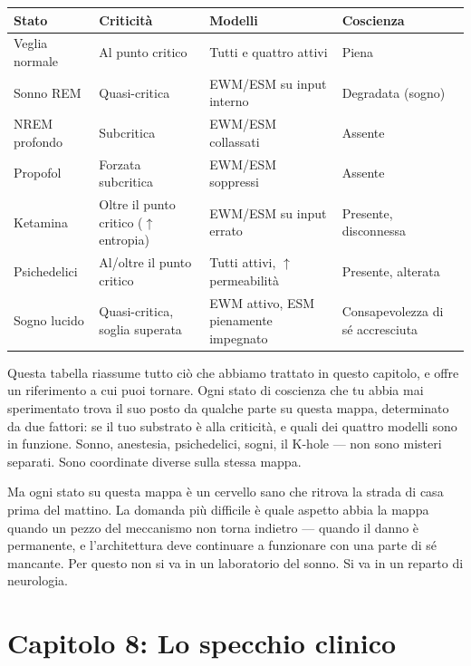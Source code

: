 \documentclass[11pt, twoside, openright]{book}
\begin{document}
\small
\begin{xltabular}{\linewidth}{X X X X}
\toprule
\textbf{Stato} & \textbf{Criticità} & \textbf{Modelli} & \textbf{Coscienza} \\
\midrule\endhead
Veglia normale & Al punto critico & Tutti e quattro attivi & Piena \\[4pt]
Sonno REM & Quasi-critica & EWM/\allowbreak{}ESM su input interno & Degradata (sogno) \\[4pt]
NREM profondo & Subcritica & EWM/\allowbreak{}ESM collassati & Assente \\[4pt]
Propofol & Forzata subcritica & EWM/\allowbreak{}ESM soppressi & Assente \\[4pt]
Ketamina & Oltre il punto critico ($\uparrow$ entropia) & EWM/\allowbreak{}ESM su input errato & Presente, disconnessa \\[4pt]
Psichedelici & Al/\allowbreak{}oltre il punto critico & Tutti attivi, $\uparrow$ permeabilità & Presente, alterata \\[4pt]
Sogno lucido & Quasi-critica, soglia superata & EWM attivo, ESM pienamente impegnato & Consapevolezza di sé accresciuta \\[4pt]
\bottomrule
\end{xltabular}
\normalsize


Questa tabella riassume tutto ciò che abbiamo trattato in questo capitolo, e offre un riferimento a cui puoi tornare. Ogni stato di coscienza che tu abbia mai sperimentato trova il suo posto da qualche parte su questa mappa, determinato da due fattori: se il tuo substrato è alla criticità, e quali dei quattro modelli sono in funzione. Sonno, anestesia, psichedelici, sogni, il K-hole --- non sono misteri separati. Sono coordinate diverse sulla stessa mappa.

Ma ogni stato su questa mappa è un cervello sano che ritrova la strada di casa prima del mattino. La domanda più difficile è quale aspetto abbia la mappa quando un pezzo del meccanismo non torna indietro --- quando il danno è permanente, e l'architettura deve continuare a funzionare con una parte di sé mancante. Per questo non si va in un laboratorio del sonno. Si va in un reparto di neurologia.


\chapter*{Capitolo 8: Lo specchio clinico}
\end{document}
